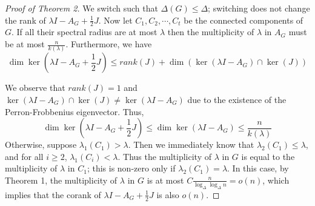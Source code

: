 \documentclass{article}
\theoremstyle{definition} %
\theoremstyle{plain} %
\begin{document}
\begin{proof}[Proof of Theorem 2]
We switch such that $\Delta(G) \leq \Delta$; switching does not change the rank of $\lambda I - A_G + \frac{1}{2}J$. Now let $C_1, C_2,\cdots, C_t$ be the connected components of $G$. If all their spectral radius are at most $\lambda$ then the multiplicity of $\lambda$ in $A_G$ must be at most $\frac{n}{k(\lambda)}$. Furthermore, we have
$$\dim\ker (\lambda I - A_G + \frac{1}{2}J) \leq rank(J) + \dim(\ker(\lambda I - A_G)\cap\ker(J))$$

We observe that $rank(J)=1$ and $\ker(\lambda I - A_G)\cap\ker(J) \neq \ker(\lambda I - A_G)$ due to the existence of the Perron-Frobbenius eigenvector. Thus,
$$\dim\ker (\lambda I - A_G + \frac{1}{2}J) \leq \dim\ker (\lambda I - A_G)\leq \frac{n}{k(\lambda)}$$
Otherwise, suppose $\lambda_1(C_1) > \lambda$. Then we immediately know that $\lambda_2(C_1) \leq \lambda$, and for all $i\geq 2$, $\lambda_1(C_i) < \lambda$. Thus the multiplicity of $\lambda$ in $G$ is equal to the multiplicity of $\lambda$ in $C_1$; this is non-zero only if $\lambda_2(C_1) = \lambda$. In this case, by Theorem 1, the multiplicity of $\lambda$ in $G$ is at most $C\frac{n}{\log_\Delta\log_\Delta n} = o(n)$, which implies that the corank of $\lambda I - A_G + \frac{1}{2}J$ is also $o(n)$.
\end{proof}
\end{document}
